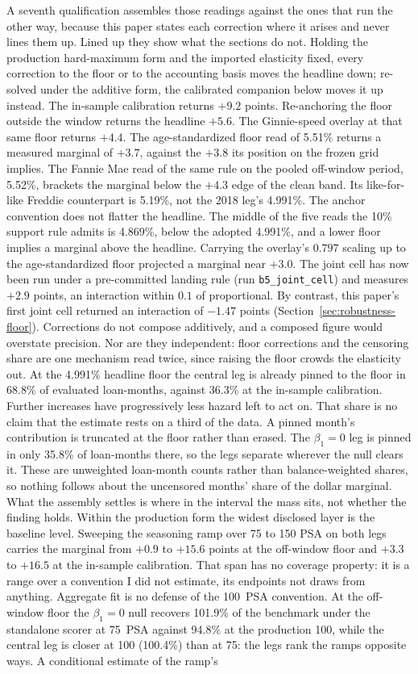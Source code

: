 \documentclass[12pt]{article}
\begin{document}
A seventh qualification assembles those readings against the ones that run the other way, because this paper states each correction where it arises and never lines them up. Lined up they show what the sections do not. Holding the production hard-maximum form and the imported elasticity fixed, every correction to the floor or to the accounting basis moves the headline down; re-solved under the additive form, the calibrated companion below moves it up instead. The in-sample calibration returns $+9.2$ points. Re-anchoring the floor outside the window returns the headline $+5.6$. The Ginnie-speed overlay at that same floor returns $+4.4$. The age-standardized floor read of 5.51\% returns a measured marginal of $+3.7$, against the $+3.8$ its position on the frozen grid implies. The Fannie Mae read of the same rule on the pooled off-window period, 5.52\%, brackets the marginal below the $+4.3$ edge of the clean band. Its like-for-like Freddie counterpart is 5.19\%, not the 2018 leg's 4.991\%. The anchor convention does not flatter the headline. The middle of the five reads the 10\% support rule admits is 4.869\%, below the adopted 4.991\%, and a lower floor implies a marginal above the headline. Carrying the overlay's $0.797$ scaling up to the age-standardized floor projected a marginal near $+3.0$. The joint cell has now been run under a pre-committed landing rule (run \texttt{b5\_joint\_cell}) and measures $+2.9$ points, an interaction within $0.1$ of proportional. By contrast, this paper's first joint cell returned an interaction of $-1.47$ points (Section~\ref{sec:robustness-floor}). Corrections do not compose additively, and a composed figure would overstate precision. Nor are they independent: floor corrections and the censoring share are one mechanism read twice, since raising the floor crowds the elasticity out. At the 4.991\% headline floor the central leg is already pinned to the floor in 68.8\% of evaluated loan-months, against 36.3\% at the in-sample calibration. Further increases have progressively less hazard left to act on. That share is no claim that the estimate rests on a third of the data. A pinned month's contribution is truncated at the floor rather than erased. The $\beta_1 = 0$ leg is pinned in only 35.8\% of loan-months there, so the legs separate wherever the null clears it. These are unweighted loan-month counts rather than balance-weighted shares, so nothing follows about the uncensored months' share of the dollar marginal. What the assembly settles is where in the interval the mass sits, not whether the finding holds. Within the production form the widest disclosed layer is the baseline level. Sweeping the seasoning ramp over 75 to 150 PSA on both legs carries the marginal from $+0.9$ to $+15.6$ points at the off-window floor and $+3.3$ to $+16.5$ at the in-sample calibration. That span has no coverage property: it is a range over a convention I did not estimate, its endpoints not draws from anything. Aggregate fit is no defense of the 100~PSA convention. At the off-window floor the $\beta_1 = 0$ null recovers 101.9\% of the benchmark under the standalone scorer at 75~PSA against 94.8\% at the production 100, while the central leg is closer at 100 (100.4\%) than at 75: the legs rank the ramps opposite ways. A conditional estimate of the ramp's 
\end{document}

